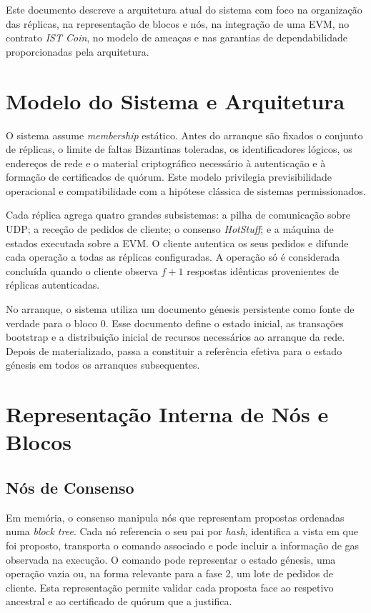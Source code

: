 \documentclass[runningheads]{llncs}
\begin{document}
Este documento descreve a arquitetura atual do sistema com foco na organiza\c{c}\~ao das r\'eplicas, na representa\c{c}\~ao de blocos e n\'os, na integra\c{c}\~ao de uma EVM, no contrato \textit{IST Coin}, no modelo de amea\c{c}as e nas garantias de dependabilidade proporcionadas pela arquitetura.

\section{Modelo do Sistema e Arquitetura}
O sistema assume \textit{membership} est\'atico. Antes do arranque s\~ao fixados o conjunto de r\'eplicas, o limite de faltas Bizantinas toleradas, os identificadores l\'ogicos, os endere\c{c}os de rede e o material criptogr\'afico necess\'ario \`a autentica\c{c}\~ao e \`a forma\c{c}\~ao de certificados de qu\'orum. Este modelo privilegia previsibilidade operacional e compatibilidade com a hip\'otese cl\'assica de sistemas permissionados.

Cada r\'eplica agrega quatro grandes subsistemas: a pilha de comunica\c{c}\~ao sobre UDP; a rece\c{c}\~ao de pedidos de cliente; o consenso \textit{HotStuff}; e a m\'aquina de estados executada sobre a EVM. O cliente autentica os seus pedidos e difunde cada opera\c{c}\~ao a todas as r\'eplicas configuradas. A opera\c{c}\~ao s\'o \'e considerada conclu\'ida quando o cliente observa \(f+1\) respostas id\^enticas provenientes de r\'eplicas autenticadas.

No arranque, o sistema utiliza um documento g\'enesis persistente como fonte de verdade para o bloco \(0\). Esse documento define o estado inicial, as transa\c{c}\~oes bootstrap e a distribui\c{c}\~ao inicial de recursos necess\'arios ao arranque da rede. Depois de materializado, passa a constituir a refer\^encia efetiva para o estado g\'enesis em todos os arranques subsequentes.

\section{Representa\c{c}\~ao Interna de N\'os e Blocos}

\subsection{N\'os de Consenso}
Em mem\'oria, o consenso manipula n\'os que representam propostas ordenadas numa \textit{block tree}. Cada n\'o referencia o seu pai por \textit{hash}, identifica a vista em que foi proposto, transporta o comando associado e pode incluir a informa\c{c}\~ao de gas observada na execu\c{c}\~ao. O comando pode representar o estado g\'enesis, uma opera\c{c}\~ao vazia ou, na forma relevante para a fase 2, um lote de pedidos de cliente. Esta representa\c{c}\~ao permite validar cada proposta face ao respetivo ancestral e ao certificado de qu\'orum que a justifica.
\end{document}

